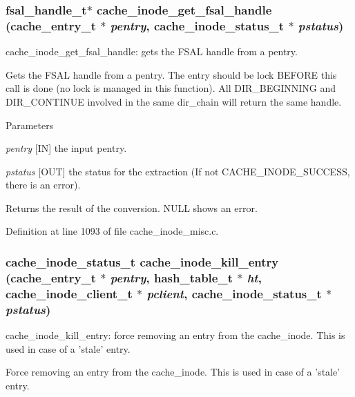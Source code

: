 \subsubsection[{cache\_\-inode\_\-get\_\-fsal\_\-handle}]{\setlength{\rightskip}{0pt plus 5cm}fsal\_\-handle\_\-t$\ast$ cache\_\-inode\_\-get\_\-fsal\_\-handle (cache\_\-entry\_\-t $\ast$ {\em pentry}, \/  cache\_\-inode\_\-status\_\-t $\ast$ {\em pstatus})}\label{cache__inode__misc_8c_a625ee0acb63c4e7f1b342389c5dd7a0b}
cache\_\-inode\_\-get\_\-fsal\_\-handle: gets the FSAL handle from a pentry.

Gets the FSAL handle from a pentry. The entry should be lock BEFORE this call is done (no lock is managed in this function). All DIR\_\-BEGINNING and DIR\_\-CONTINUE involved in the same dir\_\-chain will return the same handle.


\begin{DoxyParams}{Parameters}
\item[{\em pentry}][IN] the input pentry. \item[{\em pstatus}][OUT] the status for the extraction (If not CACHE\_\-INODE\_\-SUCCESS, there is an error).\end{DoxyParams}
\begin{DoxyReturn}{Returns}
the result of the conversion. NULL shows an error. 
\end{DoxyReturn}


Definition at line 1093 of file cache\_\-inode\_\-misc.c.
\subsubsection[{cache\_\-inode\_\-kill\_\-entry}]{\setlength{\rightskip}{0pt plus 5cm}cache\_\-inode\_\-status\_\-t cache\_\-inode\_\-kill\_\-entry (cache\_\-entry\_\-t $\ast$ {\em pentry}, \/  hash\_\-table\_\-t $\ast$ {\em ht}, \/  cache\_\-inode\_\-client\_\-t $\ast$ {\em pclient}, \/  cache\_\-inode\_\-status\_\-t $\ast$ {\em pstatus})}\label{cache__inode__misc_8c_aed59b090dbed68c7eca3a1b5514a11c5}
cache\_\-inode\_\-kill\_\-entry: force removing an entry from the cache\_\-inode. This is used in case of a 'stale' entry.

Force removing an entry from the cache\_\-inode. This is used in case of a 'stale' entry.


